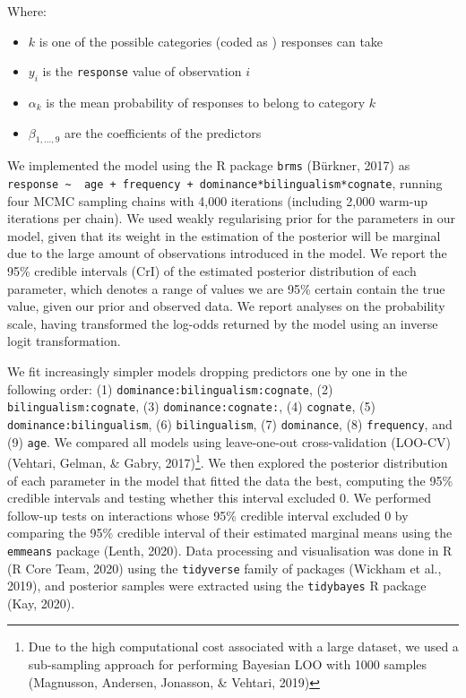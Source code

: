 \documentclass[
  english,
  man,man,floatsintext]{apa6}
\providecommand{\tightlist}{%
  \setlength{\itemsep}{0pt}\setlength{\parskip}{0pt}}
\begin{document}
Where:

\begin{itemize}
\tightlist
\item
  \(k\) is one of the possible categories (coded as ) responses can take
\item
  \(y_i\) is the \texttt{response} value of observation \(i\)
\item
  \(\alpha_k\) is the mean probability of responses to belong to category \(k\)
\item
  \(\beta_{1, \dots, 9}\) are the coefficients of the predictors
\end{itemize}

We implemented the model using the R package \texttt{brms} (Bürkner, 2017) as \texttt{response\ \textasciitilde{}\ \ age\ +\ frequency\ +\ dominance*bilingualism*cognate}, running four MCMC sampling chains with 4,000 iterations (including 2,000 warm-up iterations per chain). We used weakly regularising prior for the parameters in our model, given that its weight in the estimation of the posterior will be marginal due to the large amount of observations introduced in the model. We report the 95\% credible intervals (CrI) of the estimated posterior distribution of each parameter, which denotes a range of values we are 95\% certain contain the true value, given our prior and observed data. We report analyses on the probability scale, having transformed the log-odds returned by the model using an inverse logit transformation.

We fit increasingly simpler models dropping predictors one by one in the following order: (1) \texttt{dominance:bilingualism:cognate}, (2) \texttt{bilingualism:cognate}, (3) \texttt{dominance:cognate:}, (4) \texttt{cognate}, (5) \texttt{dominance:bilingualism}, (6) \texttt{bilingualism}, (7) \texttt{dominance}, (8) \texttt{frequency}, and (9) \texttt{age}. We compared all models using leave-one-out cross-validation (LOO-CV) (Vehtari, Gelman, \& Gabry, 2017)\footnote{Due to the high computational cost associated with a large dataset, we used a sub-sampling approach for performing Bayesian LOO with 1000 samples (Magnusson, Andersen, Jonasson, \& Vehtari, 2019)}. We then explored the posterior distribution of each parameter in the model that fitted the data the best, computing the 95\% credible intervals and testing whether this interval excluded 0. We performed follow-up tests on interactions whose 95\% credible interval excluded 0 by comparing the 95\% credible interval of their estimated marginal means using the \texttt{emmeans} package (Lenth, 2020). Data processing and visualisation was done in R (R Core Team, 2020) using the \texttt{tidyverse} family of packages (Wickham et al., 2019), and posterior samples were extracted using the \texttt{tidybayes} R package (Kay, 2020).
\end{document}

